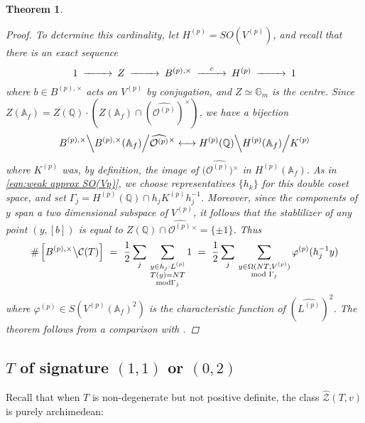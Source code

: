 \documentclass[reqno,oneside]{amsart}
\theoremstyle{plain}
\newtheorem{theorem}{Theorem}
\theoremstyle{remark}
\numberwithin{theorem}{section}
\newcommand{\bbA}{\mathbb A}
\newcommand{\bbQ}{\mathbb Q}
\newcommand{\calC}{\mathcal C}
\newcommand{\calO}{\mathcal O}
\newcommand{\calZ}{\mathcal Z}
\begin{document}
\begin{theorem}
\begin{proof}
			To determine this cardinality, let $H^{(p)} = SO(V^{(p)})$, and recall that there is an exact sequence
			\begin{equation}
			\begin{CD}
			1 @>>> Z @>>> B^{(p),\times} @>c>> H^{(p)} @>>> 1
			\end{CD}
			\end{equation}
			where $b \in B^{(p),\times}$ acts on $V^{(p)}$ by conjugation, and $Z \simeq \mathbb G_m$ is the centre. Since $Z(\bbA_f) = Z(\bbQ) \cdot \left( Z(\bbA_f) \cap ( \widehat{ \calO^{(p)}})^{\times} \right) $, we have a bijection
			\begin{equation} \label{eqn:ss points double coset}
			B^{(p), \times} \Big\backslash  B^{(p),\times}(\bbA_f) \Big/   \widehat{ \calO^{(p)}}  {}^{\times} \longleftrightarrow  H^{(p)} (\bbQ) \Big\backslash H^{(p)} (\bbA_f) \Big/ K^{(p)}
			\end{equation}
			where $K^{(p)}$ was, by definition, the image of $(\widehat{ \calO^{(p)})}{}^{\times}$ in $H^{(p)} (\bbA_f)$. As in \eqref{eqn:weak approx SO(Vp)}, we choose representatives $\{ h_k\}$ for this double coset space, and set $  \Gamma_j = H^{(p)}(\bbQ) \cap  h_j K^{(p)} h^{-1}_j$.
			Moreover, since the components of $y$ span a two dimensional subspace of $V^{(p)}$, it follows that the stablilizer of any point $(y, [b])$ is equal to $Z(\mathbb Q) \cap \widehat{\calO^{(p)}}{}^{\times} = \{ \pm 1 \}$. Thus
			\begin{align}
			\# \left[ B^{(p), \times} \big\backslash \calC(T)\right] \ =  \ \frac12 \sum_j \, \sum_{\substack{y \in h_j \cdot L^{(p)} \\ T(y) = NT  \\ \text{mod} \Gamma_j }} 1 \ =  \ \frac12  \sum_j \, \sum_{\substack{y \in \Omega(NT, V^{(p)}) \\ \text{mod } \Gamma_j }} \varphi^{(p)}(h_j^{-1} y)
			\end{align}
			where $\varphi^{(p)} \in S(V^{(p)}(\bbA_f)^2)$ is the characteristic function of $(\widehat{ L^{(p)}})^{2}$.	The theorem follows from a comparison with .
		\end{proof}
	\end{theorem}
	
	
	
	
	\subsection{ $T$ of signature $(1,1)$ or $(0,2)$}
	Recall that when $T$ is non-degenerate but not positive definite, the class $\widehat{\calZ}(T,v)$ is purely archimedean:
	
\end{document}

